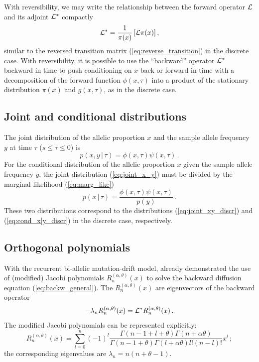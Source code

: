 \documentclass[preprint]{elsarticle}
\newcommand\given{{\,|\,}}
\begin{document}
With reversibility, we may write the relationship between the forward operator ${\cal L}$ and its adjoint ${\cal L}^{*}$ compactly
\begin{equation}\label{compact}
{\cal L}^{*}=\frac1{\pi(x)}\left[{\cal L}\pi(x)\right],
\end{equation}
similar to the reversed transition matrix (\ref{eq:reverse_transition}) in the discrete case. With reversibility, it is possible to use the ``backward'' operator ${\cal L}^{*}$ backward in time to push conditioning on $x$ back or forward in time with a decomposition of the forward function  $\phi(x,\tau)$ into a product of the stationary distribution $\pi(x)$ and $g(x,\tau)$, as in the discrete case.

\subsection{Joint and conditional distributions}

The joint distribution of the allelic proportion $x$ and the sample allele frequency $y$ at time $\tau$ ($s \le \tau \le 0$) is
\begin{equation}\label{eq:joint_x_y}
p(x,y \given \tau)= \phi(x, \tau)\psi(x,\tau)\,.
\end{equation}
For the conditional distribution of the allelic proportion $x$ given the sample allele frequency $y$, the joint distribution (\ref{eq:joint_x_y}) must be divided by the marginal likelihood (\ref{eq:marg_like})
\begin{equation}\label{eq:cond_x|y}
p(x\given \tau)= \frac{\phi(x, \tau)\psi(x,\tau)}{p(y)}\,.
\end{equation}
These two distributions correspond to the distributions (\ref{eq:joint_xy_discr}) and (\ref{eq:cond_x|y_discr}) in the discrete case, respectively. 

\subsection{Orthogonal polynomials}

With the recurrent bi-allelic mutation-drift model, \citet{Song12} already demonstrated the use of (modified) Jacobi polynomials $R_n^{(\alpha,\theta)}(x)$ to solve the backward diffusion equation (\ref{eq:backw_general}). The  $R_n^{(\alpha,\theta)}(x)$ are eigenvectors of the backward operator
\begin{equation}
    -\lambda_nR_n^{(\alpha,\theta)}(x)={\cal L}^{*}R_n^{(\alpha,\theta)}(x)\,.
\end{equation}
The modified Jacobi polynomials can be represented explicitly:
\begin{equation}
  R_n^{(\alpha,\theta)}(x)=\sum_{l=0}^n(-1)^l\frac{\Gamma(n-1+l+\theta)\Gamma(n+\alpha\theta)}{\Gamma(n-1+\theta)\Gamma(l+\alpha\theta)l!(n-l)!}x^l\,;
\end{equation}
the corresponding eigenvalues are $\lambda_n=n(n+\theta-1)$. 
\end{document}
